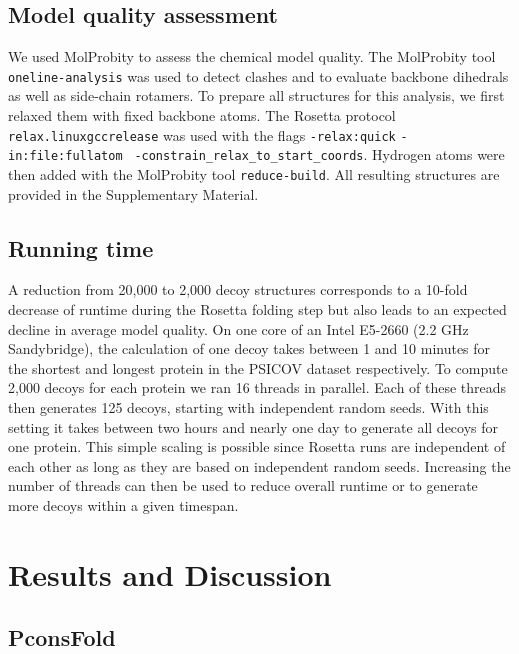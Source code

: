 \documentclass{bioinfo}
\begin{document}
\begin{methods}
\subsection{Model quality assessment}

We used MolProbity \cite[]{chen_molprobity:_2010} to assess the chemical
model quality. The MolProbity tool {\tt oneline-analysis} was used to 
detect clashes and to evaluate backbone dihedrals as well as 
side-chain rotamers. To prepare all structures for this analysis, we 
first relaxed them with fixed backbone atoms.
The Rosetta protocol {\tt relax.linuxgccrelease} was used with the flags 
{\tt -relax:quick} {\tt -in:file:fullatom} {\tt 
-constrain\_relax\_to\_start\_coords}. Hydrogen atoms were then 
added with the MolProbity tool {\tt reduce-build}. All resulting 
structures are provided in the Supplementary Material.



\subsection{Running time}
A reduction from 20,000 to 2,000 decoy structures corresponds to a 10-fold
decrease of runtime during the Rosetta folding step but also leads to an
expected decline in average model quality. On one core of an Intel
E5-2660 (2.2 GHz Sandybridge), the calculation of one decoy takes
between 1 and 10 minutes for the shortest and longest protein in the
PSICOV dataset respectively. To compute 2,000 decoys for each protein
we ran 16 threads in parallel. Each of these threads then generates
125 decoys, starting with independent random seeds. With this setting
it takes between two hours and nearly one day to generate all decoys
for one protein. This simple scaling is possible since Rosetta runs
are independent of each other as long as they are based on 
independent random seeds. Increasing the number of threads can then be used to reduce
overall runtime or to generate more decoys within a given timespan.

\end{methods}


\section{Results and Discussion}

\subsection{PconsFold}
\end{document}
